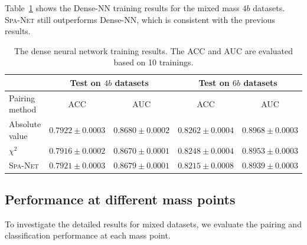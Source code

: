 \documentclass[12pt]{article}
\begin{document}
        Table~\ref{tab:DNN_training_results_mix_1M_4b} shows the Dense-NN training results for the mixed mass $4b$ datasets. \textsc{Spa-Net} still outperforms Dense-NN, which is consistent with the previous results.
        \begin{table}[htpb]
            \centering
            \caption{The dense neural network training results. The ACC and AUC are evaluated based on 10 trainings.}
            \label{tab:DNN_training_results_mix_1M_4b}
            \begin{tabular}{l|cc|cc}
                             & \multicolumn{2}{c|}{Test on $4b$ datasets}& \multicolumn{2}{c}{Test on $6b$ datasets} \\ \hline
            Pairing method   & ACC                 & AUC                 & ACC                 & AUC                 \\ \hline
            Absolute value   & $0.7922 \pm 0.0003$ & $0.8680 \pm 0.0002$ & $0.8262 \pm 0.0004$ & $0.8968 \pm 0.0003$ \\
            $\chi^2$         & $0.7916 \pm 0.0002$ & $0.8670 \pm 0.0001$ & $0.8248 \pm 0.0004$ & $0.8953 \pm 0.0003$ \\
            \textsc{Spa-Net} & $0.7921 \pm 0.0003$ & $0.8679 \pm 0.0001$ & $0.8215 \pm 0.0008$ & $0.8939 \pm 0.0003$
            \end{tabular}
        \end{table}
    \subsection{Performance at different mass points}%
    \label{sub:performance_at_different_mass_points}
        To investigate the detailed results for mixed datasets, we evaluate the pairing and classification performance at each mass point.
\end{document}
